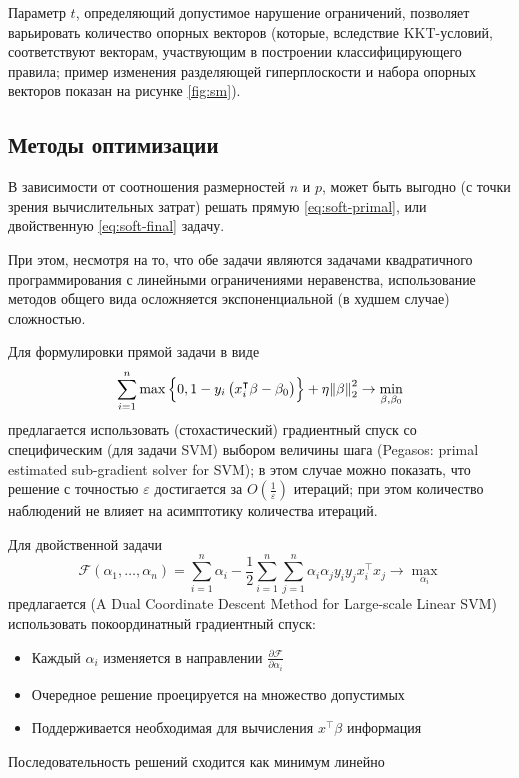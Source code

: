 \documentclass[11pt, a4paper]{article}\usepackage[]{graphicx}\usepackage[]{color}
\begin{document}
Параметр $t$, определяющий допустимое нарушение ограничений, позволяет варьировать количество опорных векторов (которые, вследствие KKT-условий,
соответствуют векторам, участвующим в построении классифицирующего правила; пример изменения
разделяющей гиперплоскости и набора опорных векторов показан на рисунке \ref{fig:sm}).

\subsection{Методы оптимизации}
В зависимости от соотношения размерностей $n$ и $p$, может быть выгодно (с точки зрения вычислительных затрат) решать прямую \eqref{eq:soft-primal},
или двойственную \ref{eq:soft-final} задачу.

При этом, несмотря на то, что обе задачи являются задачами квадратичного программирования с линейными
ограничениями неравенства, использование методов общего вида осложняется экспоненциальной (в худшем случае)
сложностью.

Для формулировки прямой задачи в виде 
	$$
		\sum\limits_{i=1}^n\max\left\{0, 1-y_i\left(x_i^\intercal \beta - \beta_0\right)\right\}+\eta\norm{\beta}^2_2\rightarrow \min\limits_{\beta,\beta_0}
		$$
предлагается использовать (стохастический) градиентный спуск со специфическим (для задачи SVM) выбором
величины шага (Pegasos: primal estimated sub-gradient solver for SVM); в этом случае можно показать,
что решение с точностью $\varepsilon$ достигается за $O\left(\frac{1}{\varepsilon}\right)$ итераций;
при этом количество наблюдений не влияет на асимптотику количества итераций.

Для двойственной задачи
	$$
		\mathcal{F}\left(\alpha_1,\dots,\alpha_n\right) = \sum\limits_{i=1}^{n}\alpha_i - \frac{1}{2}\sum\limits_{i=1}^n\sum\limits_{j=1}^n\alpha_i\alpha_jy_iy_jx_i^\intercal x_j \rightarrow \max\limits_{\alpha_i}
	$$
предлагается (A Dual Coordinate Descent Method for Large-scale Linear SVM) использовать покоординатный градиентный спуск:
	\begin{itemize}
		\item Каждый $\alpha_i$ изменяется в направлении $\frac{\partial \mathcal{F}}{\partial \alpha_i}$
		\item Очередное решение проецируется на множество допустимых
		\item Поддерживается необходимая для вычисления $x^\intercal \beta$ информация
	\end{itemize}

	Последовательность решений сходится как минимум линейно
\end{document}

